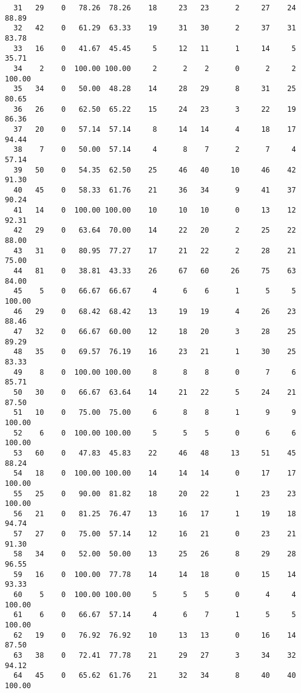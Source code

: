 \begin{verbatim}
  31   29    0   78.26  78.26    18     23   23      2     27    24    88.89
  32   42    0   61.29  63.33    19     31   30      2     37    31    83.78
  33   16    0   41.67  45.45     5     12   11      1     14     5    35.71
  34    2    0  100.00 100.00     2      2    2      0      2     2   100.00
  35   34    0   50.00  48.28    14     28   29      8     31    25    80.65
  36   26    0   62.50  65.22    15     24   23      3     22    19    86.36
  37   20    0   57.14  57.14     8     14   14      4     18    17    94.44
  38    7    0   50.00  57.14     4      8    7      2      7     4    57.14
  39   50    0   54.35  62.50    25     46   40     10     46    42    91.30
  40   45    0   58.33  61.76    21     36   34      9     41    37    90.24
  41   14    0  100.00 100.00    10     10   10      0     13    12    92.31
  42   29    0   63.64  70.00    14     22   20      2     25    22    88.00
  43   31    0   80.95  77.27    17     21   22      2     28    21    75.00
  44   81    0   38.81  43.33    26     67   60     26     75    63    84.00
  45    5    0   66.67  66.67     4      6    6      1      5     5   100.00
  46   29    0   68.42  68.42    13     19   19      4     26    23    88.46
  47   32    0   66.67  60.00    12     18   20      3     28    25    89.29
  48   35    0   69.57  76.19    16     23   21      1     30    25    83.33
  49    8    0  100.00 100.00     8      8    8      0      7     6    85.71
  50   30    0   66.67  63.64    14     21   22      5     24    21    87.50
  51   10    0   75.00  75.00     6      8    8      1      9     9   100.00
  52    6    0  100.00 100.00     5      5    5      0      6     6   100.00
  53   60    0   47.83  45.83    22     46   48     13     51    45    88.24
  54   18    0  100.00 100.00    14     14   14      0     17    17   100.00
  55   25    0   90.00  81.82    18     20   22      1     23    23   100.00
  56   21    0   81.25  76.47    13     16   17      1     19    18    94.74
  57   27    0   75.00  57.14    12     16   21      0     23    21    91.30
  58   34    0   52.00  50.00    13     25   26      8     29    28    96.55
  59   16    0  100.00  77.78    14     14   18      0     15    14    93.33
  60    5    0  100.00 100.00     5      5    5      0      4     4   100.00
  61    6    0   66.67  57.14     4      6    7      1      5     5   100.00
  62   19    0   76.92  76.92    10     13   13      0     16    14    87.50
  63   38    0   72.41  77.78    21     29   27      3     34    32    94.12
  64   45    0   65.62  61.76    21     32   34      8     40    40   100.00

\end{verbatim}
